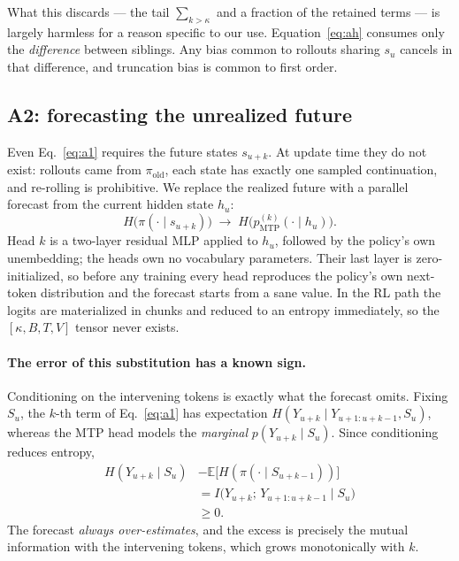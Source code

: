 \documentclass[11pt]{article}
\newcommand{\E}{\mathbb{E}}
\begin{document}
What this discards --- the tail $\sum_{k > \kappa}$ and a fraction of the retained
terms --- is largely harmless for a reason specific to our use. Equation~\eqref{eq:ah}
consumes only the \emph{difference} between siblings. Any bias common to rollouts
sharing $s_u$ cancels in that difference, and truncation bias is common to first
order.

\subsection{A2: forecasting the unrealized future}

Even Eq.~\eqref{eq:a1} requires the future states $s_{u+k}$. At update time they do
not exist: rollouts came from $\pi_{\mathrm{old}}$, each state has exactly one
sampled continuation, and re-rolling is prohibitive. We replace the realized future
with a parallel forecast from the current hidden state $h_u$:
%
\begin{equation}
H\bigl(\pi(\cdot \mid s_{u+k})\bigr) \;\longrightarrow\;
H\bigl(p^{(k)}_{\mathrm{MTP}}(\cdot \mid h_u)\bigr).
\label{eq:a2}
\end{equation}
%
Head $k$ is a two-layer residual MLP applied to $h_u$, followed by the policy's own
unembedding; the heads own no vocabulary parameters. Their last layer is
zero-initialized, so before any training every head reproduces the policy's own
next-token distribution and the forecast starts from a sane value. In the RL path the
logits are materialized in chunks and reduced to an entropy immediately, so the
$[\kappa, B, T, V]$ tensor never exists.

\paragraph{The error of this substitution has a known sign.}
Conditioning on the intervening tokens is exactly what the forecast omits. Fixing
$S_u$, the $k$-th term of Eq.~\eqref{eq:a1} has expectation
$H(Y_{u+k} \mid Y_{u+1:u+k-1}, S_u)$, whereas the MTP head models the
\emph{marginal} $p(Y_{u+k} \mid S_u)$. Since conditioning reduces entropy,
%
\begin{equation}
\begin{split}
H(Y_{u+k} \mid S_u) &- \E\bigl[H(\pi(\cdot \mid S_{u+k-1}))\bigr]\\
&= I\bigl(Y_{u+k};\, Y_{u+1:u+k-1} \mid S_u\bigr)\\
&\ge 0 .
\end{split}
\label{eq:mi}
\end{equation}
%
The forecast \emph{always over-estimates}, and the excess is precisely the mutual
information with the intervening tokens, which grows monotonically with $k$.
\end{document}
